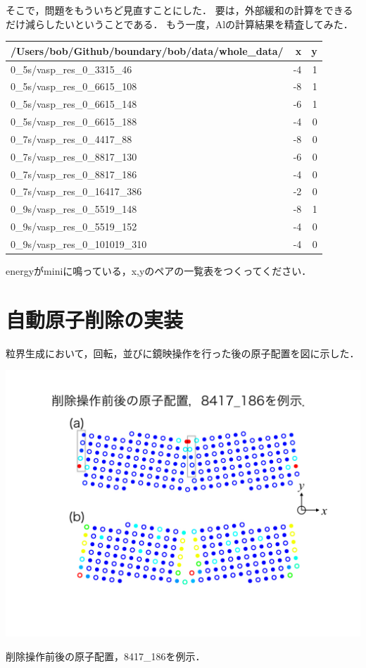 そこで，問題をもういちど見直すことにした．
要は，外部緩和の計算をできるだけ減らしたいということである．
もう一度，Alの計算結果を精査してみた．

\begin{longtable}[]{@{}lrr@{}}
\toprule
/Users/bob/Github/boundary/bob/data/whole\_data/ & x & y\tabularnewline
\midrule
\endhead
0\_5s/vasp\_res\_0\_3315\_46 & -4 & 1\tabularnewline
0\_5s/vasp\_res\_0\_6615\_108 & -8 & 1\tabularnewline
0\_5s/vasp\_res\_0\_6615\_148 & -6 & 1\tabularnewline
0\_5s/vasp\_res\_0\_6615\_188 & -4 & 0\tabularnewline
0\_7s/vasp\_res\_0\_4417\_88 & -8 & 0\tabularnewline
0\_7s/vasp\_res\_0\_8817\_130 & -6 & 0\tabularnewline
0\_7s/vasp\_res\_0\_8817\_186 & -4 & 0\tabularnewline
0\_7s/vasp\_res\_0\_16417\_386 & -2 & 0\tabularnewline
0\_9s/vasp\_res\_0\_5519\_148 & -8 & 1\tabularnewline
0\_9s/vasp\_res\_0\_5519\_152 & -4 & 0\tabularnewline
0\_9s/vasp\_res\_0\_101019\_310 & -4 & 0\tabularnewline
\bottomrule
\end{longtable}

energyがminiに鳴っている，x,yのペアの一覧表をつくってください．

    \section{自動原子削除の実装}\label{ux81eaux52d5ux539fux5b50ux524aux9664ux306eux5b9fux88c5}

粒界生成において，回転，並びに鏡映操作を行った後の原子配置を図に示した．

\begin{center}
\includegraphics[width=150mm]{../.././auto_delete/auto_delete.002.jpeg}
\end{center}
削除操作前後の原子配置，8417\_186を例示．

